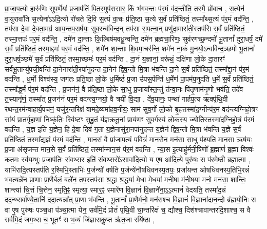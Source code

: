 प्रा॒जा॒प॒त्यो हारु॑णिः सुप॒र्णेयः॑ प्र॒जाप॑तिं पि॒तर॒मुप॑ससार॒ किं भ॑गव॒न्तः प॑र॒मं व॑द॒न्तीति॒ तस्मै॒ प्रो॑वाच \sep
स॒त्येन॑ वा॒युरावा॑ति स॒त्येना॑ऽऽदि॒त्यो रो॑चते दि॒वि स॒त्यं वा॒चः प्र॑ति॒ष्ठा स॒त्ये स॒र्वं प्रति॑ष्ठितं॒ तस्मा᳚थ्स॒त्यं प॑र॒मं वद॑न्ति॒ \sep
तप॑सा दे॒वा दे॒वता॒मग्र॑ आय॒न्तप॒सर्\mbox{}ष॑यः॒ सुव॒रन्व॑विन्द॒न् तप॑सा स॒पत्ना॒न् प्रणु॑दा॒मारा॑ती॒स्तप॑सि स॒र्वं प्रति॑ष्ठितं॒ तस्मा॒त्तपः॑ पर॒मं वद॑न्ति॒ \sep
दमे॑न दा॒न्ताः कि॒ल्बिष॑मवधू॒न्वन्ति॒ दमे॑न ब्रह्मचा॒रिणः॒ सुव॑रगच्छ॒न्दमो॑ भू॒तानां᳚ दुरा॒धर्\mbox{}षं॒ दमे॑ स॒र्वं प्रति॑ष्ठितं॒ तस्मा॒द्दमः॑ पर॒मं वद॑न्ति॒ \sep
शमे॑न शा॒न्ताः  शि॒वमा॒चर॑न्ति॒ शमे॑न ना॒कं मु॒नयो॒ऽन्ववि॑न्द॒ञ्छमो॑ भू॒तानां᳚ दुरा॒धर्\mbox{}ष॒ञ्छमे॑ स॒र्वं प्रति॑ष्ठितं॒ तस्मा॒च्छमः॑ पर॒मं वद॑न्ति \sep
दा॒नं य॒ज्ञानां॒ वरू॑थं॒ दक्षि॑णा लो॒के दा॒तारꣳ॑ सर्वभू॒तान्यु॑पजी॒वन्ति॑ दा॒नेनारा॑ती॒रपा॑नुदन्त दा॒नेन॑ द्विष॒न्तो मि॒त्रा भ॑वन्ति दा॒ने स॒र्वं प्रति॑ष्ठितं॒ तस्मा᳚द्दा॒नं प॑र॒मं वद॑न्ति \sep
ध॒र्मो विश्व॑स्य॒ जग॑तः प्रति॒ष्ठा लो॒के ध॒र्मिष्ठं॑ प्र॒जा उ॑पस॒र्पन्ति॑ ध॒र्मेण॑ पा॒पम॑प॒नुद॑ति ध॒र्मे स॒र्वं प्रति॑ष्ठितं॒ तस्मा᳚द्ध॒र्मं प॑र॒मं वद॑न्ति \sep
प्र॒जन॑नं॒ वै प्र॑ति॒ष्ठा लो॒के सा॒धु प्र॒जाया᳚स्त॒न्तुं त॑न्वा॒नः पि॑तृ॒णाम॑नृ॒णो भव॑ति॒ तदे॑व त॒स्यानृ॑णं॒ तस्मा᳚त् प्र॒जन॑नं पर॒मं वद॑न्त्य॒ग्नयो॒ वै त्रयी॑ वि॒द्या \sep
 दे॑व॒यानः॒ पन्था॑ गार्\mbox{}हप॒त्य ऋक्पृ॑थि॒वी र॑थन्त॒रम॑न्वाहार्य॒पच॑नं॒ यजु॑र॒न्तरि॑क्षं वामदे॒व्यमा॑हव॒नीयः॒ साम॑ सुव॒र्गो लो॒को बृ॒हत्तस्मा॑द॒ग्नीन्प॑र॒मं वद॑न्त्यग्निहो॒त्रꣳ सा॑यं प्रा॒तर्गृ॒हाणां॒ निष्कृ॑तिः॒ स्वि॑ष्टꣳ सुहु॒तं य॑ज्ञक्रतू॒नां प्राय॑णꣳ सुव॒र्गस्य॑ लो॒कस्य॒ ज्योति॒स्तस्मा॑दग्निहो॒त्रं प॑र॒मं वद॑न्ति \sep
 य॒ज्ञ इति॑ य॒ज्ञेन॒ हि दे॒वा दिवं॑ ग॒ता य॒ज्ञेनासु॑रा॒नपा॑नुदन्त य॒ज्ञेन॑ द्विष॒न्तो मि॒त्रा भ॑वन्ति य॒ज्ञे स॒र्वं प्रति॑ष्ठितं॒ तस्मा᳚द्य॒ज्ञं प॑र॒मं वद॑न्ति \sep 
 मान॒सं वै प्रा॑जाप॒त्यं प॒वित्रं॑ मान॒सेन॒ मन॑सा सा॒धु प॑श्यति मान॒सा ऋष॑यः प्र॒जा अ॑सृजन्त मान॒से स॒र्वं प्रति॑ष्ठितं॒ तस्मा᳚न्मान॒सं प॑र॒मं वद॑न्ति \sep
 न्या॒स इ॒त्याहु॑र्मनी॒षिणो᳚ ब्र॒ह्माणं॑ ब्र॒ह्मा विश्वः॑ कत॒मः स्व॑य॒म्भुः प्र॒जाप॑तिः संवथ्स॒र इति॑ संवथ्स॒रो॑ऽसावा॑दि॒त्यो य ए॒ष आ॑दि॒त्ये पुरु॑षः॒ स प॑रमे॒ष्ठी ब्रह्मा॒त्मा \sep
 याभि॑रादि॒त्यस्तप॑ति र॒श्मिभि॒स्ताभिः॑ प॒र्जन्यो॑ वर्\mbox{}षति प॒र्जन्ये॑नौषधिवनस्प॒तयः॒ प्रजा॑यन्त ओषधिवनस्प॒तिभि॒रन्नं॑ भव॒त्यन्ने॑न प्रा॒णाः प्रा॒णैर्बलं॒ बले॑न॒ तप॒स्तप॑सा श्र॒द्धा श्र॒द्धया॑ मे॒धा मे॒धया॑ मनी॒षा म॑नी॒षया॒ मनो॒ मन॑सा॒ शान्तिः॒ शान्त्या॑ चि॒त्तं चि॒त्तेन॒ स्मृति॒ꣴ॒ स्मृत्या॒ स्मार॒ꣴ॒ स्मारे॑ण वि॒ज्ञानं॑  वि॒ज्ञाने॑ना॒ऽ॒ऽ॒त्मानं॑ वेदयति॒ तस्मा॑द॒न्नं दद॒न्थ्सर्वा᳚ण्ये॒तानि॑ ददा॒त्यन्ना᳚त् प्रा॒णा भ॑वन्ति \sep
  भू॒तानां᳚ प्रा॒णैर्मनो॒ मन॑सश्च वि॒ज्ञानं॑  वि॒ज्ञाना॑दान॒न्दो ब्र॑ह्मयो॒निः स वा ए॒ष पुरु॑षः पञ्च॒धा प॑ञ्चा॒त्मा येन॒ सर्व॑मि॒दं प्रोतं॑ पृथि॒वी चा॒न्तरि॑क्षं च॒ द्यौश्च॒ दिश॑श्चावान्तरदि॒शाश्च॒ स वै सर्व॑मि॒दं जग॒थ्स च॒ भूतꣳ॑ स भ॒व्यं जि॑ज्ञासकॢ॒प्त ऋ॑त॒जा रयि॑ष्ठा \sep
